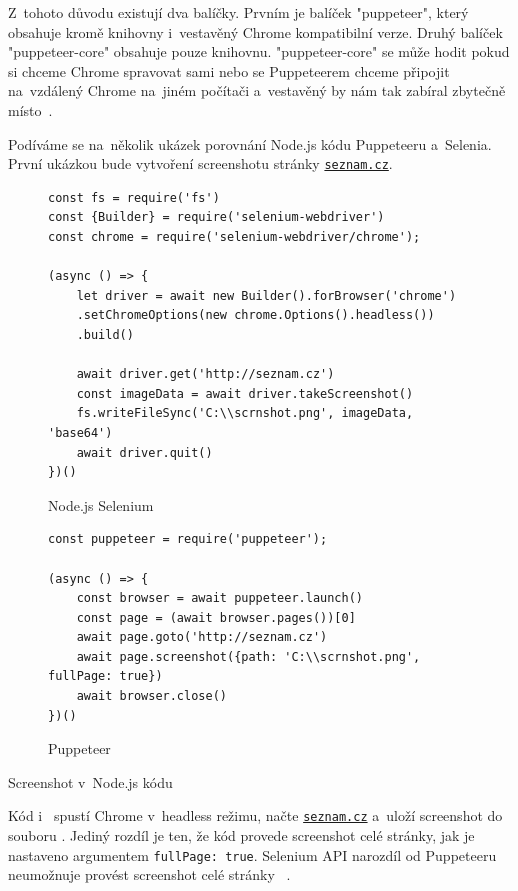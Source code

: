 \documentclass[12pt, a4paper, twoside]{article}
\begin{document}
	Z~tohoto důvodu existují dva balíčky. Prvním je balíček "puppeteer", který obsahuje kromě knihovny i~vestavěný Chrome kompatibilní verze. Druhý balíček "puppeteer-core" obsahuje pouze knihovnu. "puppeteer-core" se může hodit pokud si chceme Chrome spravovat sami nebo se Puppeteerem chceme připojit na~vzdálený Chrome na~jiném počítači a~vestavěný by nám tak zabíral zbytečně místo~\cite{puppeteerMainPage}.
	
	Podíváme se na~několik ukázek porovnání Node.js kódu Puppeteeru a~Selenia. První ukázkou bude vytvoření screenshotu stránky \href{https://seznam.cz}{\nolinkurl{seznam.cz}}.
	 \begin{codefigure}[H]
		\begin{subfigure}[t]{\textwidth}
			\begin{lstlisting}[style=MyJavaScript]
const fs = require('fs')
const {Builder} = require('selenium-webdriver')
const chrome = require('selenium-webdriver/chrome');
	
(async () => {
	let driver = await new Builder().forBrowser('chrome')
	.setChromeOptions(new chrome.Options().headless())
	.build()

	await driver.get('http://seznam.cz')
	const imageData = await driver.takeScreenshot()
	fs.writeFileSync('C:\\scrnshot.png', imageData, 'base64')
	await driver.quit()
})() 
			\end{lstlisting}
			\caption{Node.js Selenium}
			\label{subfig:seleniumScreenshot}
		\end{subfigure}   
	\end{codefigure}
	\begin{codefigure}[H]\ContinuedFloat
		\begin{subfigure}[t]{\textwidth}
			\begin{lstlisting}[style=MyJavaScript]
const puppeteer = require('puppeteer');

(async () => {
	const browser = await puppeteer.launch()
	const page = (await browser.pages())[0]
	await page.goto('http://seznam.cz')
	await page.screenshot({path: 'C:\\scrnshot.png', fullPage: true})
	await browser.close()
})()
			\end{lstlisting}
			\caption{Puppeteer}
			\label{subfig:puppeteerScreenshot}
		\end{subfigure}
		\caption{Screenshot v~Node.js kódu}
	\end{codefigure}

	Kód  i~ spustí Chrome v~headless režimu, načte \href{https://seznam.cz}{\nolinkurl{seznam.cz}} a~uloží screenshot do souboru . Jediný rozdíl je ten, že kód  provede screenshot celé stránky, jak je nastaveno argumentem \texttt{fullPage: true}. Selenium API narozdíl od Puppeteeru neumožnuje provést screenshot celé stránky~\cite{seleniumNodeJsDocs} \label{text:seleniumFullPageScreenshot}.
	
\end{document}
